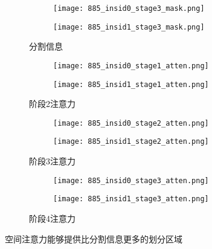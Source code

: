 \begin{figure}[H]
	\centering
	\begin{subfigure}{0.23\textwidth}
		\centering
		\begin{subfigure}[b]{\linewidth}
			\texttt{[image: 885\_insid0\_stage3\_mask.png]}
		\end{subfigure}
		\vskip2pt
		\begin{subfigure}[b]{\linewidth}
			\texttt{[image: 885\_insid1\_stage3\_mask.png]}
		\end{subfigure}
		\caption{分割信息}
	\end{subfigure}
	\begin{subfigure}{0.23\textwidth}
		\begin{subfigure}[b]{\linewidth}
			\texttt{[image: 885\_insid0\_stage1\_atten.png]}
		\end{subfigure}
		\vskip2pt
		\begin{subfigure}[b]{\linewidth}
			\texttt{[image: 885\_insid1\_stage1\_atten.png]}
		\end{subfigure}
		\caption{阶段2注意力}
	\end{subfigure}
	\begin{subfigure}{0.23\textwidth}
		\begin{subfigure}[b]{\linewidth}
			\texttt{[image: 885\_insid0\_stage2\_atten.png]}
		\end{subfigure}
		\vskip2pt
		\begin{subfigure}[b]{\linewidth}
			\texttt{[image: 885\_insid1\_stage2\_atten.png]}
		\end{subfigure}
		\caption{阶段3注意力}
	\end{subfigure}
	\begin{subfigure}{0.23\linewidth}
		\centering
		\begin{subfigure}[b]{\linewidth}
			\texttt{[image: 885\_insid0\_stage3\_atten.png]}
		\end{subfigure}
		\vskip2pt
		\begin{subfigure}[b]{\linewidth}
			\texttt{[image: 885\_insid1\_stage3\_atten.png]}
		\end{subfigure}
		\caption{阶段4注意力}
	\end{subfigure}
	\begin{minipage}{0.05\linewidth}
		
		\vskip1cm
	\end{minipage}
	\caption{空间注意力能够提供比分割信息更多的划分区域}
	\label{fig:attention_mask}
\end{figure}


